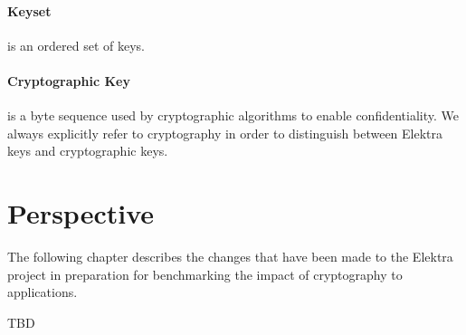\paragraph{Keyset} is an ordered set of keys.

\paragraph{Cryptographic Key} is a byte sequence used by cryptographic algorithms to enable confidentiality.
We always explicitly refer to cryptography in order to distinguish between Elektra keys and cryptographic keys.

\section{Perspective}

The following chapter describes the changes that have been made to the Elektra project in preparation for benchmarking the impact of cryptography to applications.

TBD
